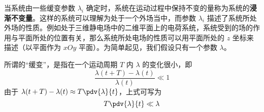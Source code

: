 
当系统由一些缓变参数 $\lambda_i$ 确定时，系统在运动过程中保持不变的量称为系统的\textbf{浸渐不变量}。这样的系统可以理解为处于一个外场当中，而参数 $\lambda_i$ 描述了系统所处外场的性质。例如处于三维静电场中的二维平面上的电荷系统，系统受到的场的作用与平面所处的位置有关，那么系统所处电场的性质可以用平面所处的 $z$ 坐标来描述（以平面作为 $xOy$ 平面）。为简单起见，我们假设只有一个参数 $\lambda$。

所谓的“缓变”，是指在一个运动周期 $T$ 内 $\lambda$ 的变化很小，即 
\begin{equation}
\frac{\lambda(t+T)-\lambda(t)}{\lambda(t)}\ll 1
\end{equation}
由于 $\lambda(t+T)-\lambda(t)\approx T\pdv{\lambda}{t}$，上式可写为
\begin{equation}
T\pdv{\lambda}{t}\ll\lambda
\end{equation}
